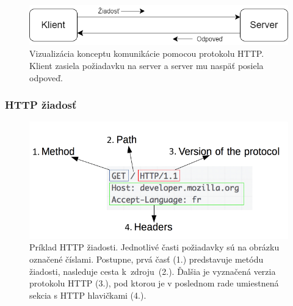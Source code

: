 \begin{figure}[htb]
\begin{center}
    \includegraphics[scale=0.6]{obrazky-figures/http-client-server.png}
    \caption{\centering Vizualizácia konceptu komunikácie pomocou protokolu HTTP. Klient zasiela požiadavku na server a server mu naspäť posiela odpoveď.}
    \label{fig:http-client-server}
\end{center}
\end{figure}

\subsubsection{HTTP žiadosť}

\begin{figure}[htb]
\begin{center}
    \includegraphics[scale=0.6]{obrazky-figures/http_request.png}
    \caption{\centering Príklad HTTP žiadosti. Jednotlivé časti požiadavky sú na obrázku označené číslami. Postupne, prvá časť (1.) predstavuje metódu žiadosti, nasleduje cesta \mbox{k zdroju (2.)}. Ďalšia je vyznačená verzia protokolu HTTP (3.), pod ktorou je v poslednom rade umiestnená sekcia s HTTP hlavičkami (4.).}
    \label{fig:http-request}
\end{center}
\end{figure}

